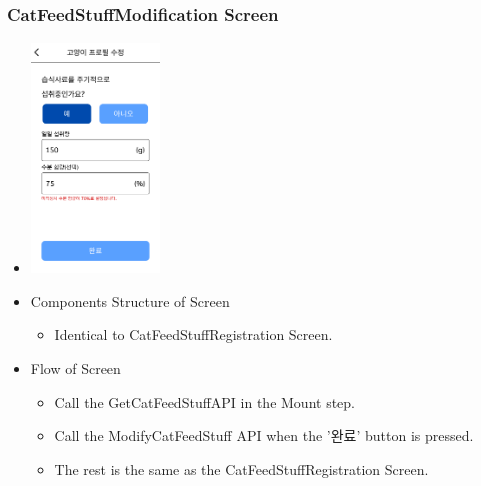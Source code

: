 \documentclass[conference]{IEEEtran}
\begin{document}
\subsubsection{CatFeedStuffModification Screen}
\begin{itemize}
    \item[] \includegraphics[width=0.27\textwidth]{img/D/20.png}
    \item Components Structure of Screen
    \begin{itemize}
        \item Identical to CatFeedStuffRegistration Screen.
    \end{itemize}
    \item Flow of Screen
    \begin{itemize}
        \item Call the GetCatFeedStuffAPI in the Mount step.
        \item Call the ModifyCatFeedStuff API when the '완료' button is pressed.
        \item The rest is the same as the CatFeedStuffRegistration Screen.
    \end{itemize}
\end{itemize}
\newpage
\end{document}
